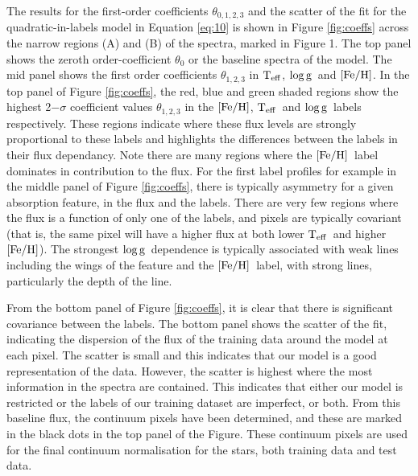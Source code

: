 \documentclass[12pt, preprint]{aastex}
\newcommand{\teff}{\mbox{$\rm T_{eff}$}}
\newcommand{\feh}{\mbox{$\rm [Fe/H]$}}
\newcommand{\logg}{\mbox{$\rm \log g$}}
\begin{document}
The results for the first-order coefficients $\theta_{0,1,2,3}$ and the scatter of the fit for the quadratic-in-labels model in Equation \ref{eq:10} is shown in Figure \ref{fig:coeffs} across the narrow regions (A) and (B) of the spectra, marked in Figure 1. 
The top panel shows the zeroth order-coefficient $\theta_0$ or the baseline spectra of the model. 
The mid panel shows the first order coefficients $\theta_{1,2,3}$ in \teff, \logg\ and \feh. 
In the top panel of Figure \ref{fig:coeffs}, the red, blue and green shaded regions show the highest 2$-\sigma$ coefficient values $\theta_{1,2,3}$ in the \feh, \teff\ and \logg\ labels respectively. 
These regions indicate where these flux levels are strongly proportional to these labels and highlights the differences between the labels in their flux dependancy. Note there are many regions where the \feh\ label dominates in contribution to the flux. 
For the first label profiles for example in the middle panel of Figure \ref{fig:coeffs}, there is typically asymmetry for a given absorption feature, in the flux and the labels. There are very few regions where the flux is a function of only one of the labels, and pixels are typically covariant (that is, the same pixel will have a higher flux at both lower \teff\ and higher \feh).
 The strongest \logg\ dependence is typically associated with weak lines including the wings of the feature and the \feh\ label, with strong lines, particularly the depth of the line. 

From the bottom panel of Figure \ref{fig:coeffs}, it is clear that there is significant covariance between the labels. 
The bottom panel shows the scatter of the fit, indicating the dispersion of the flux of the training data around the model at each pixel. 
The scatter is small and this indicates that our model is a good representation of the data. 
However, the scatter is highest where the most information in the spectra are contained. 
This indicates that either our model is restricted or the labels of our training dataset are imperfect, or both. 
From this baseline flux, the continuum pixels have been determined, and these are marked in the black dots in the top panel of the Figure. 
These continuum pixels are used for the final continuum normalisation for the stars, both training data and test data. 

\end{document}
